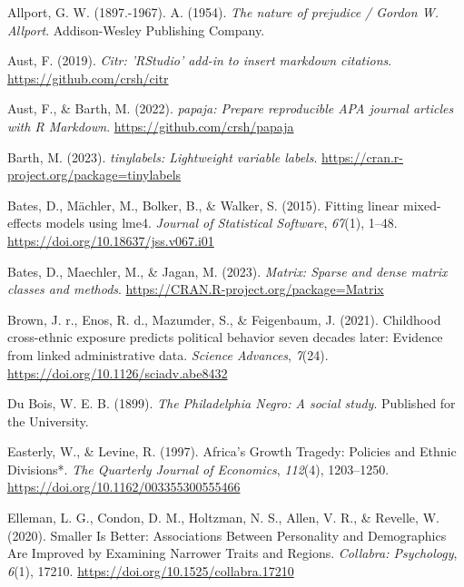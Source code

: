 \documentclass[
  man,floatsintext]{apa7}
\newlength{\cslhangindent}
\newlength{\cslentryspacingunit} %
\newenvironment{CSLReferences}[2] %
 {%
  \setlength{\parindent}{0pt}
  \ifodd #1
  \let\oldpar\par
  \def\par{\hangindent=\cslhangindent\oldpar}
  \fi
  \setlength{\parskip}{#2\cslentryspacingunit}
 }%
 {}
\begin{document}
\hypertarget{refs}{}
\begin{CSLReferences}{1}{0}
\leavevmode{}%
Allport, G. W. (1897.-1967). A. (1954). \emph{The nature of prejudice / {Gordon W}. {Allport}}. Addison-Wesley Publishing Company.

\leavevmode{}%
Aust, F. (2019). \emph{Citr: 'RStudio' add-in to insert markdown citations}. \url{https://github.com/crsh/citr}

\leavevmode{}%
Aust, F., \& Barth, M. (2022). \emph{{papaja}: {Prepare} reproducible {APA} journal articles with {R Markdown}}. \url{https://github.com/crsh/papaja}

\leavevmode{}%
Barth, M. (2023). \emph{{tinylabels}: Lightweight variable labels}. \url{https://cran.r-project.org/package=tinylabels}

\leavevmode{}%
Bates, D., Mächler, M., Bolker, B., \& Walker, S. (2015). Fitting linear mixed-effects models using {lme4}. \emph{Journal of Statistical Software}, \emph{67}(1), 1--48. \url{https://doi.org/10.18637/jss.v067.i01}

\leavevmode{}%
Bates, D., Maechler, M., \& Jagan, M. (2023). \emph{Matrix: Sparse and dense matrix classes and methods}. \url{https://CRAN.R-project.org/package=Matrix}

\leavevmode{}%
Brown, J. r., Enos, R. d., Mazumder, S., \& Feigenbaum, J. (2021). Childhood cross-ethnic exposure predicts political behavior seven decades later: {Evidence} from linked administrative data. \emph{Science Advances}, \emph{7}(24). \url{https://doi.org/10.1126/sciadv.abe8432}

\leavevmode{}%
Du Bois, W. E. B. (1899). \emph{The {Philadelphia Negro}: {A} social study}. Published for the University.

\leavevmode{}%
Easterly, W., \& Levine, R. (1997). Africa's {Growth Tragedy}: {Policies} and {Ethnic Divisions}*. \emph{The Quarterly Journal of Economics}, \emph{112}(4), 1203--1250. \url{https://doi.org/10.1162/003355300555466}

\leavevmode{}%
Elleman, L. G., Condon, D. M., Holtzman, N. S., Allen, V. R., \& Revelle, W. (2020). Smaller {Is Better}: {Associations Between Personality} and {Demographics Are Improved} by {Examining Narrower Traits} and {Regions}. \emph{Collabra: Psychology}, \emph{6}(1), 17210. \url{https://doi.org/10.1525/collabra.17210}


\end{CSLReferences}
\end{document}
